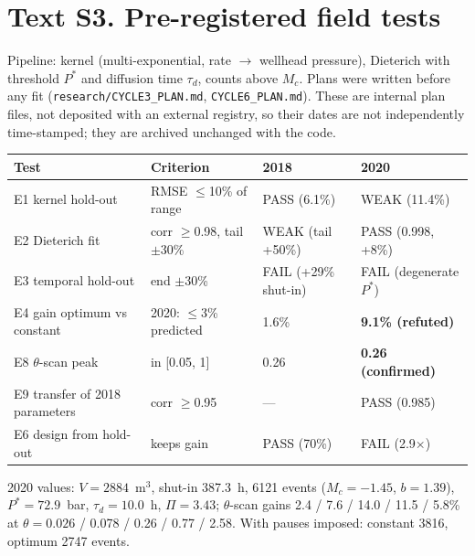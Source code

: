 \documentclass[11pt]{article}
\begin{document}
\section*{Text S3. Pre-registered field tests}
Pipeline: kernel (multi-exponential, rate $\to$ wellhead pressure), Dieterich with threshold $P^*$ and diffusion time $\tau_d$, counts above
$M_c$. Plans were written before any fit (\texttt{research/CYCLE3\_PLAN.md}, \texttt{CYCLE6\_PLAN.md}). These are internal plan files, not deposited with an external registry, so their dates are not independently time-stamped; they are archived unchanged with the code.
\begin{center}\small
\begin{tabular}{llll}\toprule
Test & Criterion & 2018 & 2020 \\\midrule
E1 kernel hold-out & RMSE $\le$10\% of range & PASS (6.1\%) & WEAK (11.4\%) \\
E2 Dieterich fit & corr $\ge$0.98, tail $\pm$30\% & WEAK (tail +50\%) & PASS (0.998, +8\%) \\
E3 temporal hold-out & end $\pm$30\% & FAIL (+29\% shut-in) & FAIL (degenerate $P^*$) \\
E4 gain optimum vs constant & 2020: $\le$3\% predicted & 1.6\% & \textbf{9.1\% (refuted)} \\
E8 $\theta$-scan peak & in [0.05, 1] & 0.26 & \textbf{0.26 (confirmed)} \\
E9 transfer of 2018 parameters & corr $\ge$0.95 & --- & PASS (0.985) \\
E6 design from hold-out & keeps gain & PASS (70\%) & FAIL (2.9$\times$) \\\bottomrule
\end{tabular}\end{center}
2020 values: $V=2884$~m$^3$, shut-in 387.3~h, 6121 events ($M_c=-1.45$, $b=1.39$), $P^*=72.9$~bar, $\tau_d=10.0$~h, $\Pi=3.43$;
$\theta$-scan gains 2.4 / 7.6 / 14.0 / 11.5 / 5.8\% at $\theta=0.026$ / 0.078 / 0.26 / 0.77 / 2.58. With pauses imposed: constant 3816,
optimum 2747 events.
\end{document}
